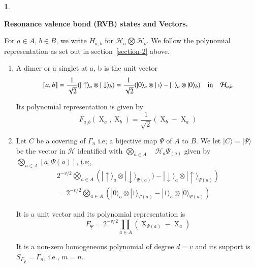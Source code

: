 \documentclass[a4paper,12pt]{article}
\DeclareMathOperator{\x}{\mathrm{X}}
\theoremstyle{definition}
\theoremstyle{underlinethm}
\theoremstyle{definition}
\newtheorem{subsubsec}{}[subsection]
\begin{document}
\begin{subsubsec}\label{subsubsection-3.1.2}

{\bfseries Resonance valence bond (RVB) states and Vectors.}

For $a\in A$, $b \in B$, we write $H_{a,b}$ for $\mathcal{H}_{a} \bigotimes \mathcal{H}_{b}$. We follow the polynomial representation as set out in section~\eqref{section-2} above.

\begin{enumerate}[label=(\alph*)]
\item A dimer or a singlet at a, b is the unit vector
$$
[a, b] = \frac{1}{\sqrt{2}} (| \uparrow \rangle_{a} \otimes | \downarrow \rangle_{b}) = \frac{1}{\sqrt{2}}(| 0\rangle_{a} \otimes | \shortmid \rangle - | \shortmid \rangle_{a} \otimes | 0 \rangle_{b})\quad {\rm in} \quad  \mathcal{H}_{a,b} 
$$

Its polynomial representation is given by
\begin{equation*}
F_{a_{1}b}(\x_{a}, \x_{b}) = \frac{1}{\sqrt{2}}(\x_{b}- \x_{a})\tag{3.3}
\end{equation*}

\item Let  $C$ be a covering of $\Gamma_{n}$ i.e; a bijective map $\Psi$ of $A$ to $B$. We let $| C \rangle = | \Psi \rangle$ be the vector in $\mathcal{H}$ identified with $\bigotimes\limits_{a \in A} \quad \mathcal{H}_{a}\Psi_{(a)}$ given by $\bigotimes\limits_{a \in A} [a, \Psi(a)]$, i.e;,
\begin{gather*}
2^{-v/2} \bigotimes\limits_{a \in A} \left(| \uparrow \rangle_{a} \otimes | \downarrow \rangle_{\Psi (a)}) - | \downarrow \rangle_{a} \otimes | \uparrow \rangle_{\Psi (a)}\right)\\
= 2^{-v/2} \bigotimes\limits_{a\in A} \left(|0\rangle_{a} \otimes | 1 \rangle_{\Psi(a)} - |1 \rangle_{a} \otimes | 0 \rangle_{\Psi(a)}\right)
\end{gather*}
 
 
It is a unit vector and its polynomial representation is 
\begin{equation}
F_{\underline{\overline{\Psi}}} = 2^{-v/2} \prod\limits_{a\in A}(\x_{\Psi(a)}- \x_{a})\tag{3.4}\label{eq-3.4}
\end{equation}

It is a non-zero homogeneous polynomial of degree $d=v$ and its support is $S_{F_{\underline{\overline{\Psi}}}} = \Gamma_{n}$, i.e., $m=n$.


\end{enumerate}
\end{subsubsec}
\end{document}
